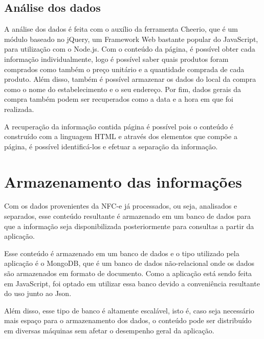 \subsection{Análise dos dados}

A análise dos dados é feita com o auxílio da ferramenta Cheerio\cite{cheerio}, que é um módulo baseado no jQuery, um Framework Web bastante popular do JavaScript\cite{stackOverflowRanking}, para utilização com o Node.js. Com o conteúdo da página, é possível obter cada informação individualmente, logo é possível saber quais produtos foram comprados como também o preço unitário e a quantidade comprada de cada produto. Além disso, também é possível armazenar os dados do local da compra como o nome do estabelecimento e o seu endereço. Por fim, dados gerais da compra também podem ser recuperados como a data e a hora em que foi realizada.

A recuperação da informação contida página é possível pois o conteúdo é construído com a linguagem HTML e através dos elementos que compõe a página, é possível identificá-los e efetuar a separação da informação.

\section{Armazenamento das informações}
\label{armazenamentoInfo}

Com os dados provenientes da NFC-e já processados, ou seja, analisados e separados, esse conteúdo resultante é armazenado em um banco de dados para que a informação seja disponibilizada posteriormente para consultas a partir da aplicação.

Esse conteúdo é armazenado em um banco de dados e o tipo utilizado pela aplicação é o MongoDB, que é um banco de dados não-relacional onde os dados são armazenados em formato de documento. Como a aplicação está sendo feita em JavaScript, foi optado em utilizar essa banco devido a conveniência resultante do uso junto ao Json.

Além disso, esse tipo de banco é altamente escalável, isto é, caso seja necessário mais espaço para o armazenamento dos dados, o conteúdo pode ser distribuído em diversas máquinas sem afetar o desempenho geral da aplicação.

